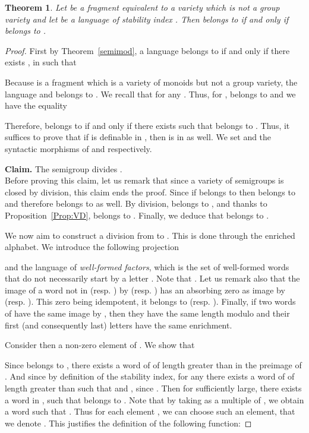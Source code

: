 \documentclass[submission,hidelink]{dmtcs-episciences}
\newtheorem{theorem}{Theorem}
\begin{document}
\begin{theorem}\label{thm:delayinftest}
	Let  be a fragment equivalent to a variety  which is not a group variety and
	let  be a language of stability index . Then  belongs to  if and only if
	 belongs to .
\end{theorem}
\begin{proof}
	First by Theorem~\ref{semimod}, a language  belongs to  if and only if there exists
	,  in  such that
	
	Because  is a fragment which is a variety of monoids but not a group variety, the
	language  and  belongs to .
	 We recall that  for any .
	Thus, for ,   belongs to  and we have the equality
	
	Therefore,  belongs to  if and only if there exists  such that
	 belongs to .
		Thus, it suffices to prove that
		if  is definable in , then
		 is in  as well.
		We set  and   the syntactic morphisms
		of  and  respectively.

		\noindent\textbf{Claim.} The semigroup  divides .\\

		Before proving this claim, let us remark that since a variety of semigroups is closed by division,
		this claim ends the proof. Since
		if  belongs to  then  belongs to  and therefore
		 belongs to  as well.
		By division,  belongs to , and thanks to Proposition~\ref{Prop:VD},  belongs to . Finally, we deduce that 
		belongs to .

		We now aim to construct a division from  to .
		This is done through the enriched alphabet.
		We introduce the following projection
		
		and  the language of \emph{well-formed factors},
		 which is the set of well-formed words that do not necessarily start by a letter .
Note that
		.
		Let us remark also that the image of a word not in  (resp. )  by  (resp. )
		has
		an absorbing zero as image by  (resp. ).
		This zero being idempotent, it belongs to  (resp. ).
		Finally, if two words of  have the same image by , then
		they have the same length modulo  and their first (and consequently last) letters have the same enrichment.

		Consider then  a non-zero element of .
		We show that
		
		Since  belongs to , there exists a word 
of  of length greater than  in the preimage of .
		And since  by definition of the stability index,
		for any  there exists a word  of  of length greater than  such that
		 and , since
		.
		Then for  sufficiently large, there exists a word  in ,
		such that  belongs to .
		Note that by taking  as a multiple of , we obtain a word  such that
		.
		Thus for each element , we can choose such an element, that we denote .
		This justifies the definition of the following function:
		

\end{proof}
\end{document}

